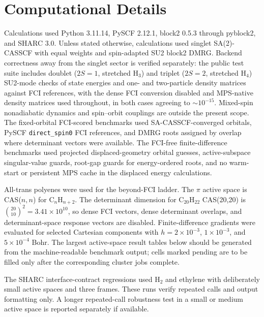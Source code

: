 \documentclass[journal=jctcce,manuscript=article]{achemso}
\begin{document}
\section{Computational Details}
Calculations used Python 3.11.14, PySCF 2.12.1, block2 0.5.3 through pyblock2, and SHARC 3.0.
Unless stated otherwise, calculations used singlet SA(2)-CASSCF with equal weights and spin-adapted SU2 block2 DMRG.
Backend correctness away from the singlet sector is verified separately: the public test suite includes doublet ($2S=1$, stretched H$_3$) and triplet ($2S=2$, stretched H$_4$) SU2-mode checks of state energies and one- and two-particle density matrices against FCI references, with the dense FCI conversion disabled and MPS-native density matrices used throughout, in both cases agreeing to $\sim10^{-15}$.
Mixed-spin nonadiabatic dynamics and spin--orbit couplings are outside the present scope.
The fixed-orbital FCI-scored benchmarks used SA-CASSCF-converged orbitals, PySCF \texttt{direct\_spin0} FCI references, and DMRG roots assigned by overlap where determinant vectors were available.
The FCI-free finite-difference benchmarks used projected displaced-geometry orbital guesses, active-subspace singular-value guards, root-gap guards for energy-ordered roots, and no warm-start or persistent MPS cache in the displaced energy calculations.

All-trans polyenes were used for the beyond-FCI ladder.
The $\pi$ active space is CAS($n,n$) for C$_n$H$_{n+2}$.
The determinant dimension for C$_{20}$H$_{22}$ CAS(20,20) is $\binom{20}{10}^{2}=3.41\times10^{10}$, so dense FCI vectors, dense determinant overlaps, and determinant-space response vectors are disabled.
Finite-difference gradients were evaluated for selected Cartesian components with $h=2\times10^{-3}$, $1\times10^{-3}$, and $5\times10^{-4}$ Bohr.
The largest active-space result tables below should be generated from the machine-readable benchmark output; cells marked pending are to be filled only after the corresponding cluster jobs complete.

The SHARC interface-contract regressions used H$_2$ and ethylene with deliberately small active spaces and three frames.
These runs verify repeated calls and output formatting only.
A longer repeated-call robustness test in a small or medium active space is reported separately if available.
\end{document}
